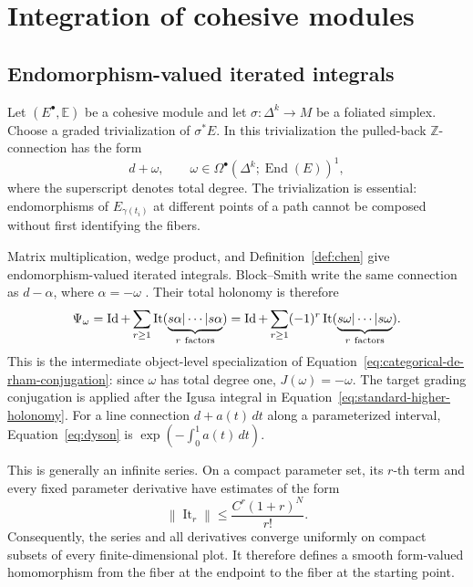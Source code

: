\documentclass[12pt]{amsart}
\theoremstyle{definition}
\theoremstyle{remark}
\numberwithin{equation}{section}
\newcommand{\Z}{{\mathbb{Z}}}
\newcommand{\1}{{\mathbb{1}}}
\newcommand{\End}{\operatorname{End}}
\newcommand{\id}{\operatorname{Id}}
\begin{document}
\section{Integration of cohesive modules}

\subsection{Endomorphism-valued iterated integrals}

Let $(E^\bullet,\mathbb E)$ be a cohesive module and let
$\sigma:\Delta^k\to M$ be a foliated simplex.  Choose a graded
trivialization of $\sigma^*E$.  In this trivialization the pulled-back
$\Z$-connection has the form
\[
 d+\omega,\qquad
 \omega\in
 \Omega^\bullet(\Delta^k;\End(E))^1,
\]
where the superscript denotes total degree.  The trivialization is
essential: endomorphisms of $E_{\gamma(t_i)}$ at different points of a
path cannot be composed without first identifying the fibers.

Matrix multiplication, wedge product, and
Definition~\ref{def:chen} give endomorphism-valued iterated integrals.
Block--Smith write the same connection as $d-\alpha$, where
$\alpha=-\omega$ \cite[Section 3.4]{BS14}.  Their total holonomy is
therefore
\begin{equation}\label{eq:dyson}
 \Psi_\omega
 =
 \id+
 \sum_{r\geq1}
 \operatorname{It}
 (\underbrace{s\alpha|\cdots|s\alpha}_{r\ {\rm factors}})
 =
 \id+
 \sum_{r\geq1}(-1)^r
 \operatorname{It}
 (\underbrace{s\omega|\cdots|s\omega}_{r\ {\rm factors}}).
\end{equation}
This is the intermediate object-level specialization of
Equation~\eqref{eq:categorical-de-rham-conjugation}: since $\omega$
has total degree one, $J(\omega)=-\omega$.  The target grading
conjugation is applied after the Igusa integral in
Equation~\eqref{eq:standard-higher-holonomy}.  For a line connection
$d+a(t)\,dt$ along a parameterized interval,
Equation~\eqref{eq:dyson} is $\exp(-\int_0^1a(t)\,dt)$.

This is generally an infinite series.  On a compact parameter set, its
$r$-th term and every fixed parameter derivative have estimates of the
form
\[
 \left\|\operatorname{It}_r\right\|
 \leq \frac{C^r(1+r)^N}{r!}.
\]
Consequently, the series and all derivatives converge uniformly on
compact subsets of every finite-dimensional plot.  It therefore
defines a smooth form-valued homomorphism from the fiber at the endpoint
to the fiber at the starting point.
\end{document}
